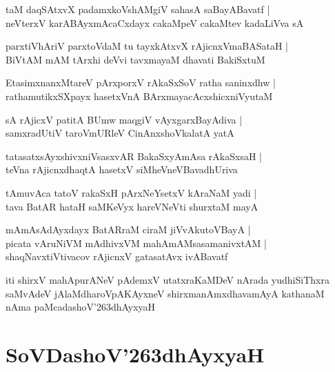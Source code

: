 \documentclass[twoside,12pt,openright]{book}
\def\S{\char'263}
\newcounter{shloka}[chapter]
\begin{document}
\begin{shloka}%
taM daqSAtxvX padamxkoVshAMgiV sahasA saBayABavatf |\\
neVterxV karABAyxmAcaCxdayx cakaMpeV cakaMtev kadaLiVva sA 
\end{shloka}

\begin{shloka}%
parxtiVhAriV parxtoVdaM tu tayxkAtxvX rAjicnxVmaBASataH |\\
BiVtAM mAM tArxhi deVvi tavxmayaM dhavati BakiSxtuM 
\end{shloka}

\begin{shloka}%
EtasimxnanxMtareV pArxporxV rAkaSxSoV ratha saninxdhw |\\
rathamutikxSXpayx hasetxVnA BArxmayacAcxshicxniVyutaM 
\end{shloka}

\begin{shloka}%
sA rAjicxV patitA BUmw maqgiV vAyxgarxBayAdiva |\\
samxradUtiV taroVmURleV CinAnxshoVkalatA yatA 
\end{shloka}

\begin{shloka}%
tatasatxsAyxshivxniVsasxvAR BakaSxyAmAsa rAkaSxsaH |\\
teVna rAjicnxdhaqtA hasetxV siMheVneVBavadhUriva
\end{shloka}

\begin{shloka}%
tAmuvAca tatoV rakaSxH pArxNeYsetxV kAraNaM yadi |\\
tava BatAR hataH saMKeVyx hareVNeVti shurxtaM mayA 
\end{shloka}

\begin{shloka}%
mAmAsAdAyxdayx BatARraM ciraM jiVvAkutoVBayA |\\
picata vAruNiVM mAdhivxVM mahAmAMsasamanivxtAM |\\
shaqNavxtiVtivacov rAjicnxV gatasatAvx ivABavatf 
\end{shloka}

\begin{center}
iti shirxV mahApurANeV pAdemxV utatxraKaMDeV  nArada yudhiSiThxra saMvAdeV jAlaMdharoVpAKAyxneV 
shirxmanAmxdhavamAyA kathanaM nAma paMcadashoV\S dhAyxyaH 
\end{center}

\chapter{SoVDashoV\S dhAyxyaH}
\end{document}
